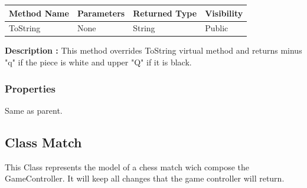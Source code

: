 \documentclass[12pt]{article}
\begin{document}
\begin{table}[H]
    \begin{tabular}{|l|l|l|l|}
    \hline
    \rowcolor[HTML]{EFEFEF} 
    \cellcolor[HTML]{EFEFEF}\textbf{Method Name} & \textbf{Parameters}  & \textbf{Returned Type} & \textbf{Visibility} \\ \hline
    ToString                                   & None                 & String                   & Public              \\ \hline
    \end{tabular}
\end{table}

\textbf{Description :} This method overrides ToString virtual
method and returns minus "q" if the piece is white and upper "Q"
if it is black.

\subsubsection{Properties}

Same as parent.

\newpage


\subsection{Class Match}

This Class represents the model of a chess match wich compose the
GameController. It will keep all changes that the game controller will return.
\end{document}
